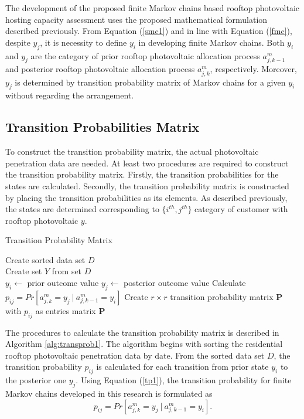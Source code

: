 The development of the proposed finite Markov chains based rooftop photovoltaic hosting capacity assessment uses the proposed mathematical formulation described previously. From Equation (\ref{smc1}) and in line with Equation (\ref{fmc}), despite $y_j$, it is necessity to define $y_i$ in developing finite Markov chains. Both $y_i$ and $y_j$ are the category of prior rooftop photovoltaic allocation process $a^m_{j,k-1}$ and posterior rooftop photovoltaic allocation process $a^m_{j,k}$, respectively. Moreover, $y_j$ is determined by transition probability matrix of Markov chains for a given $y_i$ without regarding the arrangement.
\subsection{Transition Probabilities Matrix}
To construct the transition probability matrix, the actual photovoltaic penetration data are needed. At least two procedures are required to construct the transition probability matrix. Firstly, the transition probabilities for the states are calculated. Secondly, the transition probability matrix is constructed by placing the transition probabilities as its elements. As described previously, the states are determined corresponding to $\{i^{th},j^{th}\}$ category of customer with rooftop photovoltaic $y$.

\bgroup
\begin{algorithm}[!b]
	\caption{Transition Probability Matrix}\label{alg:transprob1}
	\begin{algorithmic}[1]
		\State Create sorted data set $\mathit{D}$
		\EndProcedure \\
		
		\State{}
		\State Create set $Y$ from set $D$
		\EndProcedure \\
		
		\State{}		
		\State $y_i \gets$ prior outcome value
		\State $y_j \gets$ posterior outcome value
		\State Calculate $p_{ij}=Pr[a^m_{j,k}=y_j\ |\ \mathit{a^m_{j,k-\text{1}}}=y_i]$
		\EndFor 		
		\State Create $r\times r$ transition probability matrix $\mathbf{P}$ with $p_{ij}$ as entries
		\State\Return matrix $\mathbf{P}$
		\EndFunction
	\end{algorithmic}
\end{algorithm}
\egroup
The procedures to calculate the transition probability matrix is described in Algorithm \ref{alg:transprob1}. The algorithm begins with sorting the residential rooftop photovoltaic penetration data by date. From the sorted data set $\mathit{D}$, the transition probability $p_{ij}$ is calculated for each transition from prior state $y_i$ to the posterior one $y_j$. Using Equation (\ref{tp1}), the transition probability for finite Markov chains developed in this research is formulated as
\begin{equation}
p_{ij}=Pr[a^m_{j,k}=y_j\ |\ \mathit{a^m_{j,k-\text{1}}}=y_i]\label{tp2}.
\end{equation}

